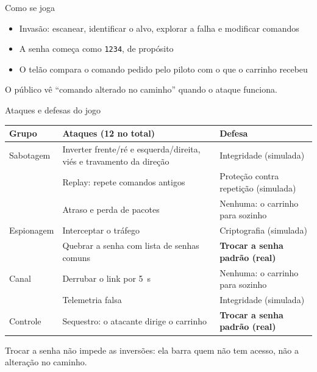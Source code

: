\documentclass[aspectratio=169,10pt]{beamer}
\newcommand{\ideia}[1]{\par\vfill\noindent\colorbox{verde!12}{\parbox{\dimexpr\linewidth-2\fboxsep\relax}{\small\strut #1\strut}}}
\begin{document}
\begin{frame}{Como se joga}
\centering
{}
\vspace{0.4cm}
\begin{itemize}
  \item Invasão: escanear, identificar o alvo, explorar a falha e modificar comandos
  \item A senha começa como \texttt{1234}, de propósito
  \item O telão compara o comando pedido pelo piloto com o que o carrinho recebeu
\end{itemize}
\ideia{O público vê \enquote{comando alterado no caminho} quando o ataque funciona.}
\end{frame}

\begin{frame}{Ataques e defesas do jogo}
\footnotesize
\begin{tabularx}{\textwidth}{@{}p{2.1cm}L>{\raggedright\arraybackslash}p{4.4cm}@{}}
\toprule
\textbf{Grupo} & \textbf{Ataques (12 no total)} & \textbf{Defesa} \\
\midrule
Sabotagem & Inverter frente/ré e esquerda/direita, viés e travamento da direção & Integridade (simulada) \\
 & Replay: repete comandos antigos & Proteção contra repetição (simulada) \\
 & Atraso e perda de pacotes & Nenhuma: o carrinho para sozinho \\
Espionagem & Interceptar o tráfego & Criptografia (simulada) \\
 & Quebrar a senha com lista de senhas comuns & \textbf{Trocar a senha padrão (real)} \\
Canal & Derrubar o link por 5~s & Nenhuma: o carrinho para sozinho \\
 & Telemetria falsa & Integridade (simulada) \\
Controle & \alert{Sequestro}: o atacante dirige o carrinho & \textbf{Trocar a senha padrão (real)} \\
\bottomrule
\end{tabularx}
\ideia{Trocar a senha não impede as inversões: ela barra quem não tem acesso, não a alteração no caminho.}
\end{frame}
\end{document}
